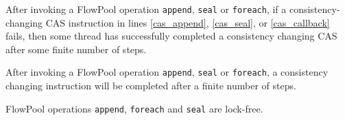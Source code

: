 \begin{lemmatwo}
After invoking a FlowPool operation \verb=append=, \verb=seal= or
\verb=foreach=, if a consistency-changing CAS instruction in lines
\ref{cas_append}, \ref{cas_seal}, or \ref{cas_callback} fails, then some thread
has successfully completed a consistency changing CAS after some finite number
of steps.
\end{lemmatwo}

\begin{lemmatwo}
After invoking a FlowPool operation \verb=append=, \verb=seal= or
\verb=foreach=, a consistency changing instruction will be completed after
a finite number of steps.
\end{lemmatwo}


\begin{theoremtwo}
FlowPool operations \verb=append=, \verb=foreach= and \verb=seal= are lock-free.
\end{theoremtwo}


\smallrulenames

